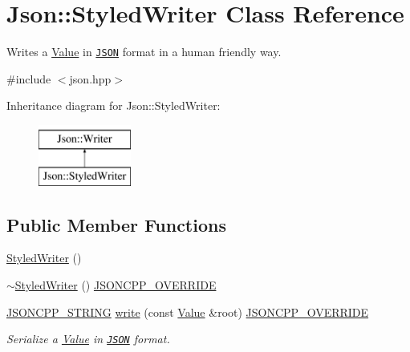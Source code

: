 \hypertarget{classJson_1_1StyledWriter}{}\section{Json\+:\+:Styled\+Writer Class Reference}
\label{classJson_1_1StyledWriter}


Writes a \hyperlink{classJson_1_1Value}{Value} in \href{http://www.json.org}{\tt J\+S\+ON} format in a human friendly way.  




{\ttfamily \#include $<$json.\+hpp$>$}

Inheritance diagram for Json\+:\+:Styled\+Writer\+:\begin{figure}[H]
\begin{center}
\leavevmode
\includegraphics[height=2.000000cm]{classJson_1_1StyledWriter}
\end{center}
\end{figure}
\subsection*{Public Member Functions}
\begin{DoxyCompactItemize}
\item 
\hyperlink{classJson_1_1StyledWriter_a1f1b5f922a6a0ef0e56c6dd2f6170192}{Styled\+Writer} ()
\item 
\hyperlink{classJson_1_1StyledWriter_a6a18380a4c5dd5e37a892dc182aac88c}{$\sim$\+Styled\+Writer} () \hyperlink{json_8hpp_a824d6199c91488107e443226fa6022c5}{J\+S\+O\+N\+C\+P\+P\+\_\+\+O\+V\+E\+R\+R\+I\+DE}
\item 
\hyperlink{json_8hpp_a1e723f95759de062585bc4a8fd3fa4be}{J\+S\+O\+N\+C\+P\+P\+\_\+\+S\+T\+R\+I\+NG} \hyperlink{classJson_1_1StyledWriter_a5efab19b9746da9920c29cdae3a6b404}{write} (const \hyperlink{classJson_1_1Value}{Value} \&root) \hyperlink{json_8hpp_a824d6199c91488107e443226fa6022c5}{J\+S\+O\+N\+C\+P\+P\+\_\+\+O\+V\+E\+R\+R\+I\+DE}
\begin{DoxyCompactList}\small\item\em Serialize a \hyperlink{classJson_1_1Value}{Value} in \href{http://www.json.org}{\tt J\+S\+ON} format. \end{DoxyCompactList}\end{DoxyCompactItemize}
